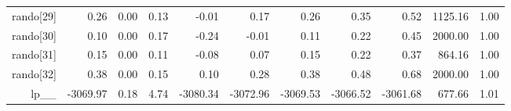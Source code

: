 \begin{table}[ht]
\begin{tabular}{rrrrrrrrrrr}
  rando[29] & 0.26 & 0.00 & 0.13 & -0.01 & 0.17 & 0.26 & 0.35 & 0.52 & 1125.16 & 1.00 \\ 
  rando[30] & 0.10 & 0.00 & 0.17 & -0.24 & -0.01 & 0.11 & 0.22 & 0.45 & 2000.00 & 1.00 \\ 
  rando[31] & 0.15 & 0.00 & 0.11 & -0.08 & 0.07 & 0.15 & 0.22 & 0.37 & 864.16 & 1.00 \\ 
  rando[32] & 0.38 & 0.00 & 0.15 & 0.10 & 0.28 & 0.38 & 0.48 & 0.68 & 2000.00 & 1.00 \\ 
  lp\_\_ & -3069.97 & 0.18 & 4.74 & -3080.34 & -3072.96 & -3069.53 & -3066.52 & -3061.68 & 677.66 & 1.01 \\ 
   \hline
\end{tabular}
\label{efit_tab}
\end{table}
